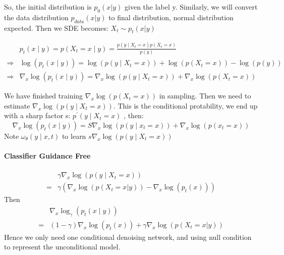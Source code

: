 So, the initial distribution is $p_0(x|y)$ given the label y. Similarly, we will convert the data distribution $p_{data}(x|y)$ to final distribution, normal distribution expected.
Then we SDE becomes: $X_t \sim p_t(x|y)$


\begin{equation}
    \begin{aligned}
    & p_{t}(x \mid y)=p\left(X_{t}=x \mid y\right)=\frac{p\left(y \mid X_{t}=x\right) p\left(X_{t}=x\right)}{p(y)} \\
    \Rightarrow & \log \left(p_{t}(x \mid y)\right)=\log \left(p\left(y \mid X_{t}=x\right)\right)+\log \left(p\left(X_{t}=x\right)\right)-\log (p(y)) \\
    \Rightarrow & \nabla_{x} \log \left(p_{t}(x \mid y)\right)=\nabla_{x} \log \left(p\left(y \mid X_{t}=x\right)\right)+\nabla_{x} \log \left(p\left(X_{t}=x\right)\right)
    \end{aligned}
\end{equation}
    
    
We have finished training  $\nabla_{x} \log \left(p\left(X_{t}=x\right)\right)$  in sampling. Then we need to estimate  $\nabla_{x} \log \left(p\left(y \mid X_{t}=x\right)\right)$. This is the conditional protability, we end up with a sharp factor s: $p^{\prime}\left(y \mid X_{t}=x\right)$ , then:
\begin{equation}
    \nabla_{x} \log \left(p_{t}(x \mid y)\right)=S \nabla_{x} \log \left(p\left(y \mid x_{t}=x\right)\right)+\nabla_{x} \log \left(p\left(x_{t}=x\right)\right)
\end{equation}
Note  $\omega_{\theta}(y \mid x, t)$  to learn  $s \nabla_{x} \log \left(p\left(y \mid X_{t}=x\right)\right)$ 

\paragraph{Classifier Guidance Free}
\begin{equation}
    \begin{aligned}
        &\gamma \nabla_{x} \log \left(p\left(y \mid X_{t}=x\right)\right)\\
         =& \gamma\left(\nabla_x \log \left(p(X_t=x|y)\right) - \nabla_x \log \left(p_t(x)\right)\right)
    \end{aligned}
\end{equation}
Then 
\begin{equation}
    \begin{aligned}
        &\nabla_{x} \log_\gamma \left(p_{t}(x \mid y)\right)\\
        =&(1-\gamma)\nabla_x \log \left(p_t(x)\right) + \gamma\nabla_x \log \left(p(X_t=x|y)\right)
    \end{aligned}
\end{equation}
Hence we only need one conditional denoising network, and using null condition to represent the unconditional model.

